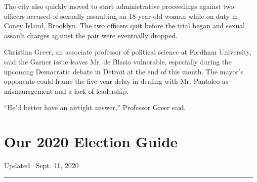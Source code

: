 The city also quickly moved to start administrative proceedings against
two officers accused of sexually assaulting an 18-year-old woman while
on duty in Coney Island, Brooklyn. The two officers quit before the
trial began and sexual assault charges against the pair were eventually
dropped.

Christina Greer, an associate professor of political science at Fordham
University, said the Garner issue leaves Mr. de Blasio vulnerable,
especially during the upcoming Democratic debate in Detroit at the end
of this month. The mayor's opponents could frame the five-year delay in
dealing with Mr. Pantaleo as mismanagement and a lack of leadership.

``He'd better have an airtight answer,'' Professor Greer said.

\hypertarget{our-2020-election-guide}{%
\section{Our 2020 Election Guide}\label{our-2020-election-guide}}

Updated ~Sept. 11, 2020

\begin{center}\rule{0.5\linewidth}{\linethickness}\end{center}

